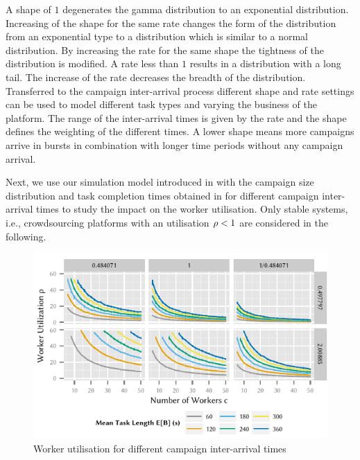 A shape of \(1\) degenerates the gamma distribution to an exponential distribution.
Increasing of the shape for the same rate changes the form of the distribution from an exponential type to a distribution which is similar to a normal distribution.
By increasing the rate for the same shape the tightness of the distribution is modified.
A rate less than \(1\) results in a distribution with a long tail.
The increase of the rate decreases the breadth of the distribution.
Transferred to the campaign inter-arrival process different shape and rate settings can be used to model different task types and varying the business of the platform.
The range of the inter-arrival times is given by the rate and the shape defines the weighting of the different times.
A lower shape means more campaigns arrive in bursts in combination with longer time periods without any campaign arrival.

Next, we use our simulation model introduced in  with the campaign size distribution and task completion times obtained in  for different campaign inter-arrival times to study the impact on the worker utilisation. 
Only stable systems, i.e., crowdsourcing platforms with an utilisation \(\rho < 1\) are considered in the following.

\begin{figure}
	\centering
	\includegraphics{cloud/crowdsourcing/numerical_evaluation/figures/parameter_utilization}
	\caption{Worker utilisation for different campaign inter-arrival times}
	\label{fig:cloud:crowdsourcing:performance_evaluation:distributions:parameter_utilization}
\end{figure}

